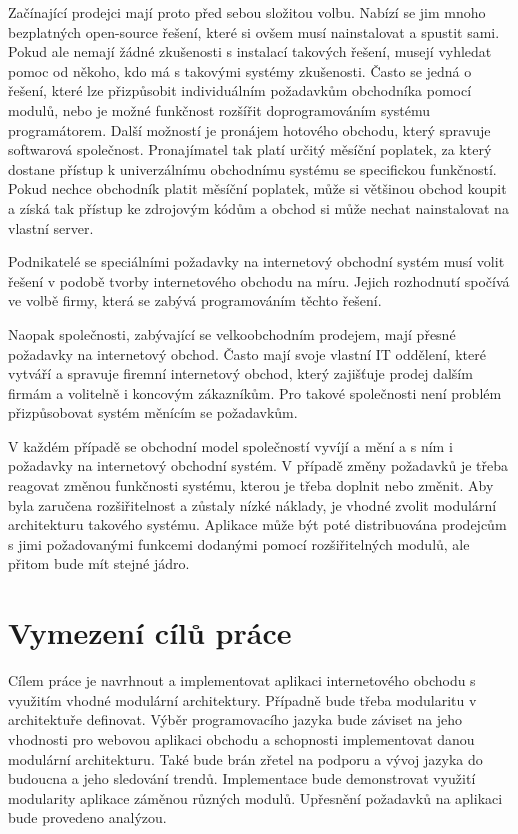 \documentclass[11pt,twoside,a4paper]{book}
\begin{document}
Začínající prodejci mají proto před sebou složitou volbu. Nabízí se jim mnoho bezplatných open-source řešení, které si ovšem musí nainstalovat a spustit sami. Pokud ale nemají žádné zkušenosti s instalací takových řešení, musejí vyhledat pomoc od někoho, kdo má s takovými systémy zkušenosti. Často se jedná o řešení, které lze přizpůsobit individuálním požadavkům obchodníka pomocí modulů, nebo je možné funkčnost rozšířit doprogramováním systému programátorem. Další možností je pronájem hotového obchodu, který spravuje softwarová společnost. Pronajímatel tak platí určitý měsíční poplatek, za který dostane přístup k univerzálnímu obchodnímu systému se specifickou funkčností. Pokud nechce obchodník platit měsíční poplatek, může si většinou obchod koupit a získá tak přístup ke zdrojovým kódům a obchod si může nechat nainstalovat na vlastní server. 

Podnikatelé se speciálními požadavky na internetový obchodní systém musí volit řešení v podobě tvorby internetového obchodu na míru. Jejich rozhodnutí spočívá ve volbě firmy, která se zabývá programováním těchto řešení.

Naopak společnosti, zabývající se velkoobchodním prodejem, mají přesné požadavky na internetový obchod. Často mají svoje vlastní IT oddělení, které vytváří a spravuje firemní internetový obchod, který zajišťuje prodej dalším firmám a volitelně i koncovým zákazníkům. Pro takové společnosti není problém přizpůsobovat systém měnícím se požadavkům.

V každém případě se obchodní model společností vyvíjí a mění a s ním i požadavky na internetový obchodní systém. V případě změny požadavků je třeba reagovat změnou funkčnosti systému, kterou je třeba doplnit nebo změnit. Aby byla zaručena rozšiřitelnost a zůstaly nízké náklady, je vhodné zvolit modulární architekturu takového systému. Aplikace může být poté distribuována prodejcům s jimi požadovanými funkcemi dodanými pomocí rozšiřitelných modulů, ale přitom bude mít stejné jádro.

\section{Vymezení cílů práce}

Cílem práce je navrhnout a implementovat aplikaci internetového obchodu s využitím vhodné modulární architektury. Případně bude třeba modularitu v architektuře definovat. Výběr programovacího jazyka bude záviset na jeho vhodnosti pro webovou aplikaci obchodu a schopnosti implementovat danou modulární architekturu. Také bude brán zřetel na podporu a vývoj jazyka do budoucna a jeho sledování trendů. Implementace bude demonstrovat využití modularity aplikace záměnou různých modulů. Upřesnění požadavků na aplikaci bude provedeno analýzou. 
\end{document}
